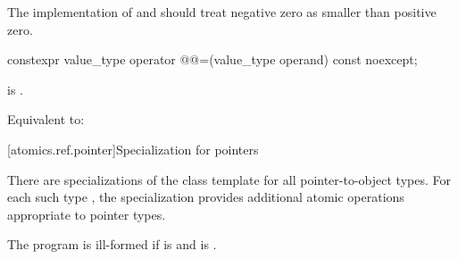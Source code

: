 \begin{itemdescr}
\pnum
\recommended
The implementation of  and 
should treat negative zero as smaller than positive zero.
\end{itemdescr}

%
%
\begin{itemdecl}
constexpr value_type operator @@=(value_type operand) const noexcept;
\end{itemdecl}

\begin{itemdescr}
\pnum
\constraints
{} is .

\pnum
\effects
Equivalent to:
\end{itemdescr}

[atomics.ref.pointer]{Specialization for pointers}
%

\pnum
There are specializations of the  class template
for all pointer-to-object types.
For each such type ,
the specialization  provides
additional atomic operations appropriate to pointer types.

\pnum
The program is ill-formed
if  is  and
 is .


